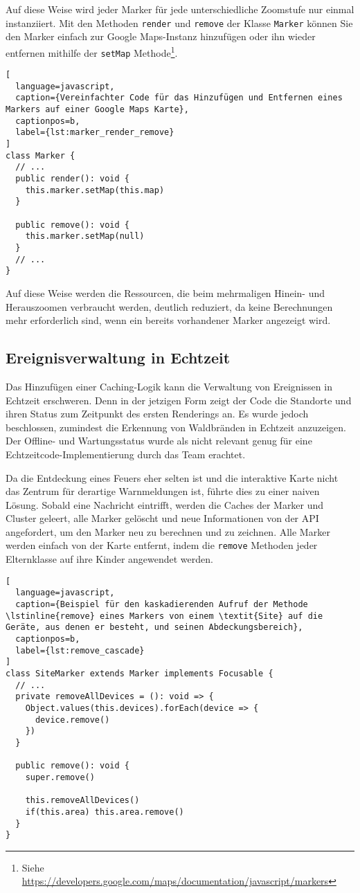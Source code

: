 Auf diese Weise wird jeder Marker für jede unterschiedliche Zoomstufe nur einmal instanziiert.
Mit den Methoden \lstinline{render} und \lstinline{remove} der Klasse \lstinline{Marker} können Sie den Marker einfach zur Google Maps-Instanz hinzufügen oder ihn wieder entfernen mithilfe der \lstinline{setMap} Methode\footnote{Siehe \href{https://developers.google.com/maps/documentation/javascript/markers}{https://developers.google.com/maps/documentation/javascript/markers}}.

\begin{lstlisting}[
  language=javascript,
  caption={Vereinfachter Code für das Hinzufügen und Entfernen eines Markers auf einer Google Maps Karte},
  captionpos=b,
  label={lst:marker_render_remove}
]
class Marker {
  // ...
  public render(): void {
    this.marker.setMap(this.map)
  }

  public remove(): void {
    this.marker.setMap(null)
  }
  // ...
}
\end{lstlisting}

Auf diese Weise werden die Ressourcen, die beim mehrmaligen Hinein- und Herauszoomen verbraucht werden, deutlich reduziert, da keine Berechnungen mehr erforderlich sind, wenn ein bereits vorhandener Marker angezeigt wird.

\subsection{Ereignisverwaltung in Echtzeit}

Das Hinzufügen einer Caching-Logik kann die Verwaltung von Ereignissen in Echtzeit erschweren.
Denn in der jetzigen Form zeigt der Code die Standorte und ihren Status zum Zeitpunkt des ersten Renderings an.
Es wurde jedoch beschlossen, zumindest die Erkennung von Waldbränden in Echtzeit anzuzeigen.
Der Offline- und Wartungsstatus wurde als nicht relevant genug für eine Echtzeitcode-Implementierung durch das Team erachtet.

Da die Entdeckung eines Feuers eher selten ist und die interaktive Karte nicht das Zentrum für derartige Warnmeldungen ist, führte dies zu einer naiven Lösung.
Sobald eine Nachricht eintrifft, werden die Caches der Marker und Cluster geleert, alle Marker gelöscht und neue Informationen von der \ac{API} angefordert, um den Marker neu zu berechnen und zu zeichnen.
Alle Marker werden einfach von der Karte entfernt, indem die \lstinline{remove} Methoden jeder Elternklasse auf ihre Kinder angewendet werden.

\begin{lstlisting}[
  language=javascript,
  caption={Beispiel für den kaskadierenden Aufruf der Methode \lstinline{remove} eines Markers von einem \textit{Site} auf die Geräte, aus denen er besteht, und seinen Abdeckungsbereich},
  captionpos=b,
  label={lst:remove_cascade}
]
class SiteMarker extends Marker implements Focusable {
  // ...
  private removeAllDevices = (): void => {
    Object.values(this.devices).forEach(device => {
      device.remove()
    })
  }

  public remove(): void {
    super.remove()

    this.removeAllDevices()
    if(this.area) this.area.remove()
  }
}
\end{lstlisting}
